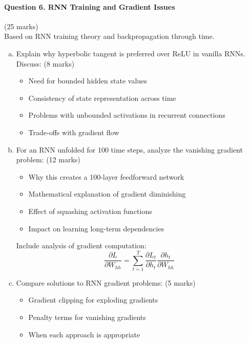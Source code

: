 \documentclass[12pt]{article}
\newcommand{\shortanswer}{\vspace{2cm}}
\newcommand{\mediumanswer}{\vspace{3cm}}
\newcommand{\journalspace}{\vspace{4.5cm}}
\begin{document}
\newpage
\paragraph{Question 6. RNN Training and Gradient Issues}\hfill (25 marks)\\
Based on RNN training theory and backpropagation through time.

\begin{enumerate}[(a)]
    \item Explain why hyperbolic tangent is preferred over ReLU in vanilla RNNs. Discuss: \hfill (8 marks)
    \begin{itemize}
        \item Need for bounded hidden state values
        \item Consistency of state representation across time
        \item Problems with unbounded activations in recurrent connections
        \item Trade-offs with gradient flow
    \end{itemize}
    
    \mediumanswer
    
    \item For an RNN unfolded for 100 time steps, analyze the vanishing gradient problem: \hfill (12 marks)
    \begin{itemize}
        \item Why this creates a 100-layer feedforward network
        \item Mathematical explanation of gradient diminishing
        \item Effect of squashing activation functions
        \item Impact on learning long-term dependencies
    \end{itemize}
    
    Include analysis of gradient computation:
    $$\frac{\partial L}{\partial W_{hh}} = \sum_{t=1}^T \frac{\partial L_t}{\partial h_t} \frac{\partial h_t}{\partial W_{hh}}$$
    
    \journalspace
    
    \item Compare solutions to RNN gradient problems: \hfill (5 marks)
    \begin{itemize}
        \item Gradient clipping for exploding gradients
        \item Penalty terms for vanishing gradients
        \item When each approach is appropriate
    \end{itemize}
    
    \shortanswer
\end{enumerate}
\end{document}
